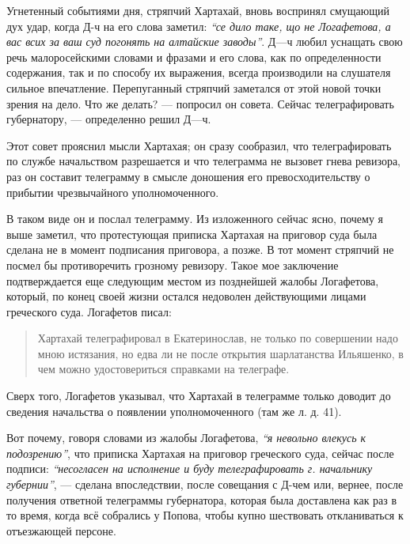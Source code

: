 \documentclass[a4paper,20pt]{report}
\begin{document}
Угнетенный событиями дня, стряпчий Хартахай, вновь воспринял смущающий дух
удар, когда Д-ч на его слова заметил: \emph{``се дило таке, що не Логафетова, а
вас всих за ваш суд погонять на алтайские заводы''}. Д—ч любил уснащать свою
речь малоросейскими словами и фразами и его слова, как по определенности
содержания, так и по способу их выражения, всегда производили на слушателя
сильное впечатление.  Перепуганный стряпчий заметался от этой новой точки
зрения на дело. Что же делать? — попросил он совета. Сейчас телеграфировать
губернатору, — определенно решил Д—ч.

Этот совет прояснил мысли Хартахая; он сразу
сообразил, что телеграфировать по службе начальством
разрешается и что телеграмма не вызовет гнева ревизора,
раз он составит телеграмму в смысле доношения его превосходительству о прибытии чрезвычайного
уполномоченного.
 
В таком виде он и послал телеграмму. Из изложенного сейчас ясно, почему я выше
заметил, что протестующая приписка Хартахая на приговор суда была сделана не в
момент подписания приговора, а позже. В тот момент стряпчий не посмел бы
противоречить грозному ревизору. Такое мое заключение подтверждается еще
следующим местом из позднейшей жалобы Логафетова, который, по конец своей жизни
остался недоволен действующими лицами греческого суда.
Логафетов писал: 

\begin{quote}
\em\bfseries

Хартахай телеграфировал в Екатеринослав, не только по совершении надо мною
истязания, но едва ли не после открытия шарлатанства Ильяшенко, в чем
можно удостовериться справками на телеграфе.  

\end{quote}

Сверх того, Логафетов указывал, что Хартахай в телеграмме только доводит до сведения начальства о появлении уполномоченного
(там же л. д. 41).

Вот почему, говоря словами из жалобы Логафетова,
\emph{``я невольно влекусь к подозрению''}, что приписка Хартахая
на приговор греческого суда, сейчас после подписи: \emph{``несогласен на исполнение и буду телеграфировать 
г. начальнику губернии''}, — сделана впоследствии, после совещания с
Д-чем или, вернее, после получения ответной телеграммы
губернатора, которая была доставлена как раз в то время,
когда всё собрались у Попова, чтобы купно шествовать откланиваться к отъезжающей персоне.
\end{document}
